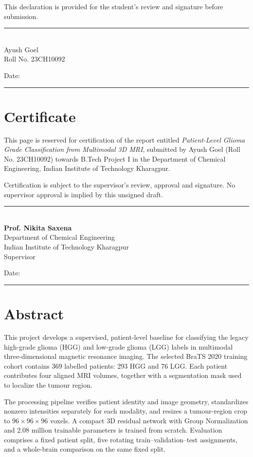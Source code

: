 \documentclass[12pt,a4paper,oneside]{report}
\newcommand{\roi}{\ensuremath{96\times96\times96}}
\begin{document}
This declaration is provided for the student's review and signature before submission.
\vspace{26mm}
\begin{flushright}
\rule{54mm}{0.4pt}\\
Ayush Goel\\
Roll No. 23CH10092
\end{flushright}
\vspace{8mm}
\noindent Date: \rule{35mm}{0.4pt}

\chapter*{Certificate}
This page is reserved for certification of the report entitled \emph{Patient-Level Glioma Grade Classification from Multimodal 3D MRI}, submitted by Ayush Goel (Roll No. 23CH10092) towards B.Tech Project I in the Department of Chemical Engineering, Indian Institute of Technology Kharagpur.

Certification is subject to the supervisor's review, approval and signature. No supervisor approval is implied by this unsigned draft.
\vspace{32mm}
\noindent\rule{65mm}{0.4pt}\\
\textbf{Prof. Nikita Saxena}\\
Department of Chemical Engineering\\
Indian Institute of Technology Kharagpur\\
Supervisor
\vspace{12mm}

\noindent Date: \rule{35mm}{0.4pt}

\chapter*{Abstract}
This project develops a supervised, patient-level baseline for classifying the legacy high-grade glioma (HGG) and low-grade glioma (LGG) labels in multimodal three-dimensional magnetic resonance imaging. The selected BraTS 2020 training cohort contains 369 labelled patients: 293 HGG and 76 LGG. Each patient contributes four aligned MRI volumes, together with a segmentation mask used to localize the tumour region.

The processing pipeline verifies patient identity and image geometry, standardizes nonzero intensities separately for each modality, and resizes a tumour-region crop to \roi{} voxels. A compact 3D residual network with Group Normalization and 2.08 million trainable parameters is trained from scratch. Evaluation comprises a fixed patient split, five rotating train--validation--test assignments, and a whole-brain comparison on the same fixed split.
\end{document}

